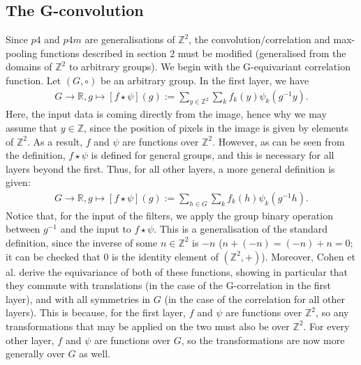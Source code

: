 \documentclass{article}
\begin{document}
\subsection{The G-convolution}
    Since \(p4\) and \(p4m\) are generalisations of \(\mathbb{Z}^2\), the convolution/correlation and max-pooling functions described in section 2 must be modified (generalised from the domains of \(\mathbb{Z}^2\) to arbitrary groups). We begin with the G-equivariant correlation function. Let \((G, \circ)\) be an arbitrary group. In the first layer, we have
    \begin{align*}
        G \to \mathbb{R}, g \mapsto [f \star \psi](g) := \sum_{y \in \mathbb{Z}^2} \sum_{k} f_k(y)\psi_k(g^{-1}y).
    \end{align*}
    Here, the input data is coming directly from the image, hence why we may assume that \(y \in \mathbb{Z}\), since the position of pixels in the image is given by elements of \(\mathbb{Z}^2\). As a result, \(f\) and \(\psi\) are functions over \(\mathbb{Z}^2\). However, as can be seen from the definition, \(f \star \psi\) is defined for general groups, and this is necessary for all layers beyond the first. Thus, for all other layers, a more general definition is given:
    \begin{align*}
        G \to \mathbb{R}, g \mapsto [f \star \psi](g) := \sum_{h \in G} \sum_{k} f_k(h)\psi_k(g^{-1}h).
    \end{align*}
    Notice that, for the input of the filters, we apply the group binary operation between \(g^{-1}\) and the input to \(f \star \psi\). This is a generalisation of the standard definition, since the inverse of some \(n \in \mathbb{Z}^2\) is \(-n\) (\(n + (-n) = (-n) + n = 0\); it can be checked that \(0\) is the identity element of \((\mathbb{Z}^2, +)\)). Moreover, Cohen et al. derive the equivariance of both of these functions, showing in particular that they commute with translations (in the case of the G-correlation in the first layer), and with all symmetries in \(G\) (in the case of the correlation for all other layers). This is because, for the first layer, \(f\) and \(\psi\) are functions over \(\mathbb{Z}^2\), so any transformations that may be applied on the two must also be over \(\mathbb{Z}^2\). For every other layer, \(f\) and \(\psi\) are functions over \(G\), so the transformations are now more generally over \(G\) as well.
\end{document}
